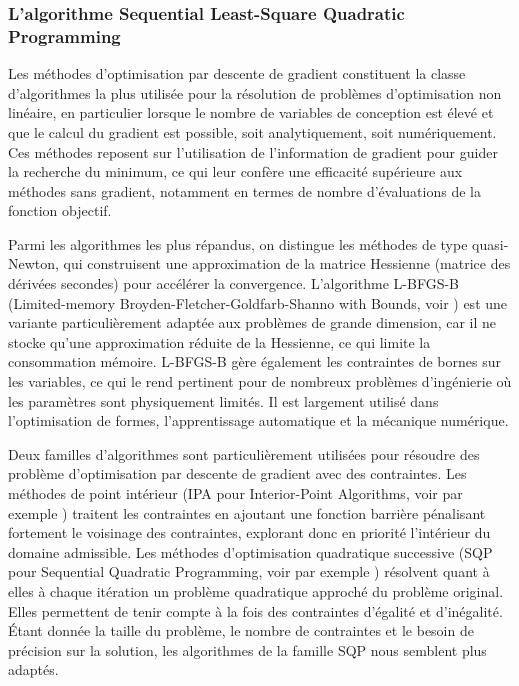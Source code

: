 \subsubsection[SLSQP]{L'algorithme Sequential Least-Square Quadratic Programming}

Les méthodes d'optimisation par descente de gradient constituent la classe d'algorithmes la plus utilisée pour la résolution de problèmes d'optimisation non linéaire, en particulier lorsque le nombre de variables de conception est élevé et que le calcul du gradient est possible, soit analytiquement, soit numériquement. Ces méthodes reposent sur l'utilisation de l'information de gradient pour guider la recherche du minimum, ce qui leur confère une efficacité supérieure aux méthodes sans gradient, notamment en termes de nombre d'évaluations de la fonction objectif.

Parmi les algorithmes les plus répandus, on distingue les méthodes de type quasi-Newton, qui construisent une approximation de la matrice Hessienne (matrice des dérivées secondes) pour accélérer la convergence. L'algorithme L-BFGS-B (Limited-memory Broyden-Fletcher-Goldfarb-Shanno with Bounds, voir \cite{Byrd1995,Zhu1995}) est une variante particulièrement adaptée aux problèmes de grande dimension, car il ne stocke qu'une approximation réduite de la Hessienne, ce qui limite la consommation mémoire. L-BFGS-B gère également les contraintes de bornes sur les variables, ce qui le rend pertinent pour de nombreux problèmes d'ingénierie où les paramètres sont physiquement limités. Il est largement utilisé dans l'optimisation de formes, l'apprentissage automatique et la mécanique numérique.

Deux familles d'algorithmes sont particulièrement utilisées pour résoudre des problème d'optimisation par descente de gradient avec des contraintes. Les méthodes de point intérieur (IPA pour Interior-Point Algorithms, voir par exemple \cite{Herskovits2004}) traitent les contraintes en ajoutant une fonction barrière pénalisant fortement le voisinage des contraintes, explorant donc en priorité l'intérieur du domaine admissible. Les méthodes d'optimisation quadratique successive (SQP pour Sequential Quadratic Programming, voir par exemple \cite{Tits2008}) résolvent quant à elles à chaque itération un problème quadratique approché du problème original. Elles permettent de tenir compte à la fois des contraintes d'égalité et d'inégalité. \'Etant donnée la taille du problème, le nombre de contraintes et le besoin de précision sur la solution, les algorithmes de la famille SQP nous semblent plus adaptés.

